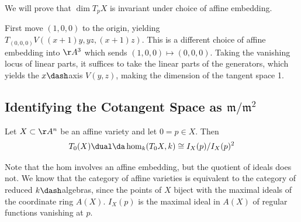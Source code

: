 \begin{remark}

We will prove that \(\dim T_p X\) is invariant under choice of affine
embedding.

\end{remark}

\begin{example}

First move \((1,0,0)\) to the origin, yielding
\(T_{(0,0,0)} V((x+1)y, yz, (x+1) z)\). This is a different choice of
affine embedding into \(\AA^3\) which sends \((1,0,0) \mapsto (0,0,0)\).
Taking the vanishing locus of linear parts, it suffices to take the
linear parts of the generators, which yields the \(x\dash\)axis
\(V(y, z)\), making the dimension of the tangent space 1.

\end{example}

\hypertarget{identifying-the-cotangent-space-as-mathfrakmmathfrakm2}{%
\subsection{\texorpdfstring{Identifying the Cotangent Space as
\(\mathfrak{m}/\mathfrak{m}^2\)}{Identifying the Cotangent Space as \textbackslash mathfrak\{m\}/\textbackslash mathfrak\{m\}\^{}2}}\label{identifying-the-cotangent-space-as-mathfrakmmathfrakm2}}

\begin{lemma}

Let \(X \subset\AA^n\) be an affine variety and let \(0 = p\in X\). Then
\begin{align*}
T_0(X)\dual \da \hom_k(T_0X, k) \cong I_X(p) / I_X(p)^2
\end{align*}

\end{lemma}

\begin{remark}

Note that the hom involves an affine embedding, but the quotient of
ideals does not. We know that the category of affine varieties is
equivalent to the category of reduced \(k\dash\)algebras, since the
points of \(X\) biject with the maximal ideals of the coordinate ring
\(A(X)\). \(I_X(p)\) is the maximal ideal in \(A(X)\) of regular
functions vanishing at \(p\).

\end{remark}

